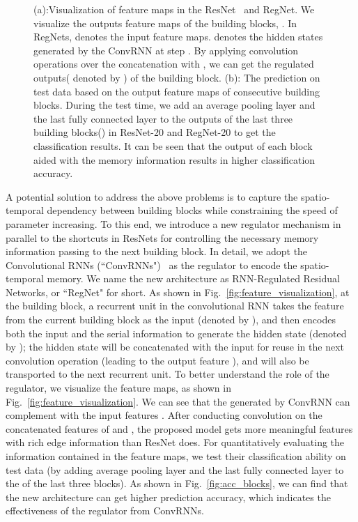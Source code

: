 \documentclass[journal,comsoc]{IEEEtran}
\begin{document}
\begin{figure*}[tbp] 
  \centering 
  \caption{(a):Visualization of feature maps in the ResNet~\cite{DBLP:journals/corr/HeZRS15} and RegNet. We visualize the outputs  feature maps of the  building blocks, . In RegNets,   denotes the input feature maps.   denotes the hidden states generated by the ConvRNN at step . By applying convolution operations over the concatenation  with , we can get the regulated outputs( denoted by ) of the  building block. (b): The prediction on test data based on the output feature maps of consecutive building blocks. During the test time, we add an average pooling layer and the last fully connected layer to the outputs of the last three building blocks() in ResNet-20 and RegNet-20 to get the classification results. It can be seen that the output of each block aided with the memory information results in higher classification accuracy.} 
\label{fig:ResNet}
\end{figure*}




A potential solution to address the above problems is to capture the spatio-temporal dependency between building blocks while constraining the speed of parameter increasing. To this end, we introduce a new regulator mechanism in parallel to the shortcuts in ResNets for controlling the necessary memory information passing to the next building block. In detail, we adopt the Convolutional RNNs (``ConvRNNs")~\cite{DBLP:journals/corr/ShiCWYWW15} as the regulator to encode the spatio-temporal memory. We name the new architecture as RNN-Regulated Residual Networks, or ``RegNet" for short. As shown in Fig.~\ref{fig:feature_visualization}, at the  building block, a recurrent unit in the convolutional RNN takes the feature from the current building block as the input (denoted by ), and then encodes both the input and the serial information to generate the hidden state (denoted by ); the hidden state will be concatenated with the input for reuse in the next convolution operation (leading to the output feature ), and will also be transported to the next recurrent unit. To better understand the role of the regulator, we visualize the feature maps, as shown in Fig.~\ref{fig:feature_visualization}. We can see that the  generated by ConvRNN can complement with the input features . After conducting convolution on the concatenated features of  and , the proposed model gets more meaningful features with rich edge information  than ResNet does. For quantitatively evaluating the information contained in the feature maps, we test their classification ability on test data (by adding average pooling layer and the last fully connected layer to the  of the last three blocks). As shown in Fig.~\ref{fig:acc_blocks}, we can find that the new architecture can get higher prediction accuracy, which indicates the effectiveness of the regulator from ConvRNNs.
\end{document}

